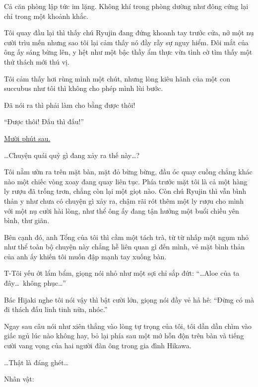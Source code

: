 \documentclass[../main.tex]{subfiles}
\begin{document}
Cả căn phòng lập tức im lặng. Không khí trong phòng dường như đông cứng lại chỉ trong một khoảnh khắc.

Tôi quay đầu lại thì thấy chú Ryujin đang đứng khoanh tay trước cửa, nở một nụ cười trìu mến nhưng sao tôi lại cảm thấy nó đầy rẫy sự nguy hiểm. Đôi mắt của ông ấy sáng bừng lên, y hệt như một bậc thầy ẩm thực vừa tình cờ tìm thấy một thử thách mới thú vị.

Tôi cảm thấy hơi rùng mình một chút, nhưng lòng kiêu hãnh của một con succubus như tôi thì không cho phép mình lùi bước.

Đã nói ra thì phải làm cho bằng được thôi!

``Được thôi! Đấu thì đấu!''

\begin{center}
\uline{Mười phút sau.}
\end{center}

\dots Chuyện quái quỷ gì đang xảy ra thế này\dots?

Tôi nằm ườn ra trên mặt bàn, mặt đỏ bừng bừng, đầu óc quay cuồng chẳng khác nào một chiếc vòng xoay đang quay liên tục. Phía trước mặt tôi là cả một hàng ly rượu đã trống trơn, chẳng còn lại một giọt nào. Còn chú Ryujin thì vẫn bình thản y như chưa có chuyện gì xảy ra, chậm rãi rót thêm một ly rượu cho mình với một nụ cười hài lòng, như thể ông ấy đang tận hưởng một buổi chiều yên bình, thư giãn.

Bên cạnh đó, anh Tổng của tôi thì cầm một tách trà, từ từ nhấp một ngụm nhỏ như thể toàn bộ chuyện này chẳng hề liên quan gì đến mình, vẻ mặt bình thản của anh ấy khiến tôi muốn đập mạnh tay xuống bàn.

T-Tôi yếu ớt lẩm bẩm, giọng nói nhỏ như một sợi chỉ sắp đứt: ``\dots Aloe của ta đây\dots\ không phục\dots''

Bác Hijaki nghe tôi nói vậy thì bật cười lớn, giọng nói đầy vẻ hả hê: ``Đừng có mà đi thách đấu linh tinh nữa, nhóc.''

Ngay sau câu nói như xiên thẳng vào lòng tự trọng của tôi, tôi dần dần chìm vào giấc ngủ lúc nào không hay, bỏ lại phía sau một mớ hỗn độn trên bàn và tiếng cười vang vọng của hai người đàn ông trong gia đình Hikawa.

\dots Thật là đáng ghét\dots

\begin{center}
{\caviar\fontsize{12pt}{12pt}\selectfont Nhân vật:   }
\end{center}
\end{document}
